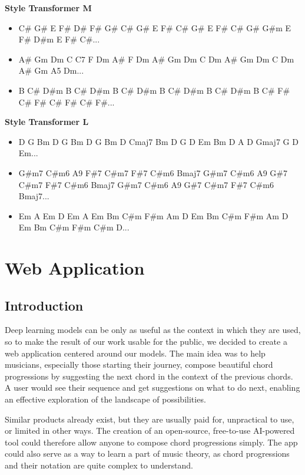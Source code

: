 \documentclass{article}
\begin{document}
\noindent \textbf{Style Transformer M}

\begin{itemize}[noitemsep,topsep=0pt]
    \item C\# G\# E F\# D\# F\# G\# C\# G\# E F\# C\# G\# E F\# C\# G\# G\#m E F\# D\#m E F\# C\#...
    \item A\# Gm Dm C C7 F Dm A\# F Dm A\# Gm Dm C Dm A\# Gm Dm C Dm A\# Gm A5 Dm...
    \item B C\# D\#m B C\# D\#m B C\# D\#m B C\# D\#m B C\# D\#m B C\# F\# C\# F\# C\# F\# C\# F\#...
\end{itemize}

\noindent \textbf{Style Transformer L}

\begin{itemize}[noitemsep,topsep=0pt]
    \item D G Bm D G Bm D G Bm D Cmaj7 Bm D G D Em Bm D A D Gmaj7 G D Em...
    \item G\#m7 C\#m6 A9 F\#7 C\#m7 F\#7 C\#m6 Bmaj7 G\#m7 C\#m6 A9 G\#7 C\#m7 F\#7 C\#m6 Bmaj7 G\#m7 C\#m6 A9 G\#7 C\#m7 F\#7 C\#m6 Bmaj7...
    \item Em A Em D Em A Em Bm C\#m F\#m Am D Em Bm C\#m F\#m Am D Em Bm C\#m F\#m C\#m D...
\end{itemize}

\section{Web Application}

\subsection{Introduction}

Deep learning models can be only as useful as the context in which they are used, so to make the result of our work usable for the public, we decided to create a web application centered around our models. The main idea was to help musicians, especially those starting their journey, compose beautiful chord progressions by suggesting the next chord in the context of the previous chords. A user would see their sequence and get suggestions on what to do next, enabling an effective exploration of the landscape of possibilities.

Similar products already exist, but they are usually paid for, unpractical to use, or limited in other ways. The creation of an open-source, free-to-use AI-powered tool could therefore allow anyone to compose chord progressions simply. The app could also serve as a way to learn a part of music theory, as chord progressions and their notation are quite complex to understand.
\end{document}
